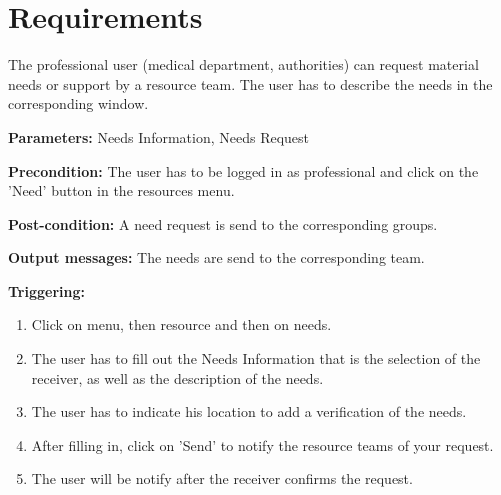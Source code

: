 \section{Requirements}
\label{operation:Requirements}
The professional user (medical department, authorities) can
request material needs or support by a resource team. The user has to describe
the needs in the corresponding window.\\
\begin{description}
\item \textbf{Parameters:} Needs Information, Needs Request
\item \textbf{Precondition:} The user has to be logged in as professional and
click on the 'Need' button in the resources menu.
\item \textbf{Post-condition:}  A need request is send to the corresponding groups.
\item \textbf{Output messages:} The needs are send to the corresponding team.
\item \textbf{Triggering:}
\begin{enumerate}
\item Click on menu, then resource and then on needs.
\item The user has to fill out the Needs Information that is the selection of
the receiver, as well as the description of the needs.
\item The user has to indicate his location to add a verification of the needs. 
\item After filling in, click on 'Send' to notify the resource teams of your
request.
\item The user will be notify after the receiver confirms the request. 
\end{enumerate}
\end{description}



